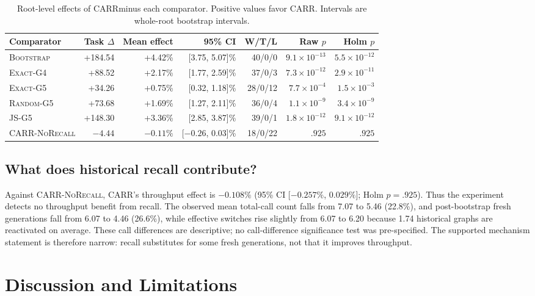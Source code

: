 \documentclass[sigconf,anonymous,review]{acmart}
\newcommand{\carr}{\textsc{CARR}}
\newcommand{\norecall}{\textsc{CARR-NoRecall}}
\newcommand{\bbootstrap}{\textsc{Bootstrap}}
\newcommand{\exactfour}{\textsc{Exact-G4}}
\newcommand{\exactfive}{\textsc{Exact-G5}}
\newcommand{\randomfive}{\textsc{Random-G5}}
\newcommand{\jsfive}{\textsc{JS-G5}}
\begin{document}
\begin{table}[t]
\caption{Root-level effects of \carr minus each comparator. Positive values
favor \carr. Intervals are whole-root bootstrap intervals.}
\label{tab:contrasts}
\centering
\small
\begin{tabular}{lrrrrrr}
\toprule
Comparator & Task $\Delta$ & Mean effect & 95\% CI & W/T/L & Raw $p$ & Holm $p$ \\
\midrule
\bbootstrap & +184.54 & +4.42\% & [3.75, 5.07]\% & 40/0/0 & $9.1{\times}10^{-13}$ & $5.5{\times}10^{-12}$ \\
\exactfour & +88.52 & +2.17\% & [1.77, 2.59]\% & 37/0/3 & $7.3{\times}10^{-12}$ & $2.9{\times}10^{-11}$ \\
\exactfive & +34.26 & +0.75\% & [0.32, 1.18]\% & 28/0/12 & $7.7{\times}10^{-4}$ & $1.5{\times}10^{-3}$ \\
\randomfive & +73.68 & +1.69\% & [1.27, 2.11]\% & 36/0/4 & $1.1{\times}10^{-9}$ & $3.4{\times}10^{-9}$ \\
\jsfive & +148.30 & +3.36\% & [2.85, 3.87]\% & 39/0/1 & $1.8{\times}10^{-12}$ & $9.1{\times}10^{-12}$ \\
\norecall & $-4.44$ & $-0.11\%$ & [$-0.26$, 0.03]\% & 18/0/22 & $.925$ & $.925$ \\
\bottomrule
\end{tabular}
\end{table}

\subsection{What does historical recall contribute?}

Against \norecall, \carr's throughput effect is $-0.108\%$ (95\% CI
[$-0.257\%$, $0.029\%$]; Holm $p=.925$). Thus the experiment detects no
throughput benefit from recall. The observed mean total-call count falls from
7.07 to 5.46 (22.8\%), and post-bootstrap fresh generations fall from 6.07 to
4.46 (26.6\%), while effective switches rise slightly from 6.07 to 6.20 because
1.74 historical graphs are reactivated on average. These call differences are
descriptive; no call-difference significance test was pre-specified. The
supported mechanism statement is therefore narrow: recall substitutes for some
fresh generations, not that it improves throughput.

\section{Discussion and Limitations}
\end{document}
